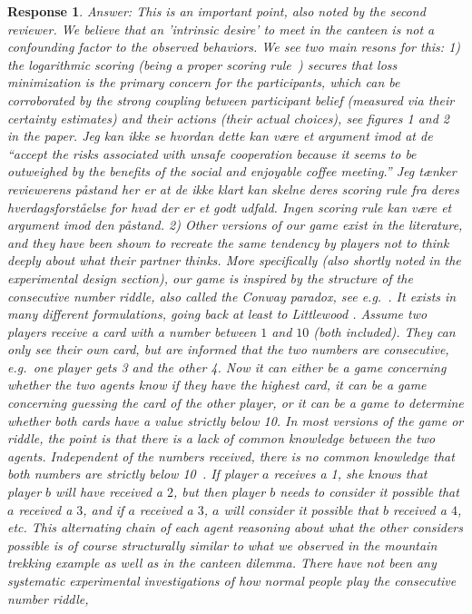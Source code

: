 \documentclass[a4paper]{article}
\newtheorem{response}{Response}
\newenvironment{robin}{\smallskip \noindent \color{red!10!green!50!blue}}{\color{black}\smallskip}
\newenvironment{tobo}{\smallskip \noindent \color{yellow!80!black!80}}{\color{black}\smallskip}
\begin{document}
\begin{itemize}
\begin{response}
\begin{robin}
Answer: This is an important point, also noted by the second reviewer. We believe that an 'intrinsic desire' to meet in the canteen is not a confounding factor to the observed behaviors. We see two main resons for this: 1) the logarithmic scoring (being a \emph{proper} scoring rule~\cite{seidenfeld1985calibration, palfrey2009eliciting}) secures that loss minimization is the primary concern for the participants, which can be corroborated by the strong coupling between participant belief (measured via their certainty estimates) and their actions (their actual choices), see figures 1 and 2 in the paper. 
\begin{tobo}
Jeg kan ikke se hvordan dette kan være et argument imod at de ``accept the risks associated with unsafe cooperation because it seems to be outweighed by the benefits of the social and enjoyable coffee meeting.'' Jeg tænker reviewerens påstand her er at de ikke klart kan skelne deres scoring rule fra deres hverdagsforståelse for hvad der er et godt udfald. Ingen scoring rule kan være et argument imod den påstand.  
\end{tobo}
2) Other versions of our game exist in the literature, and they have been shown to recreate the same tendency by players not to think deeply about what their partner thinks. More specifically (also shortly noted in the experimental design section), our game is inspired by the structure of the consecutive number riddle, also called the Conway paradox, see e.g.~\cite{van1980conway, van2015one}. It exists in many different formulations, going back at least to Littlewood \cite{littlewood1953mathematician}. Assume two players receive a card with a number between $1$ and $10$ (both included). They can only see their own card, but are informed that the two numbers are consecutive, e.g.\ one player gets 3 and the other 4. Now it can either be a game concerning whether the two agents know if they have the highest card, it can be a game concerning guessing the card of the other player, or it can be a game to determine whether both cards have a value strictly below 10. In most versions of the game or riddle, the point is that there is a lack of common knowledge between the two agents. Independent of the numbers received, there is no common knowledge that both numbers are strictly below 10~\cite{ditmarsch2008dynamic}. If player $a$ receives a 1, she knows that player $b$ will have received a $2$, but then player $b$ needs to consider it possible that $a$ received a $3$, and if $a$ received a $3$, $a$ will consider it possible that $b$ received a $4$, etc. This alternating chain of each agent reasoning about what the other considers possible is of course structurally similar to what we observed in the mountain trekking example as well as in the canteen dilemma. There have not been any systematic experimental investigations of how normal people play the consecutive number riddle, 

\end{robin}
\end{response}
\end{itemize}
\end{document}
